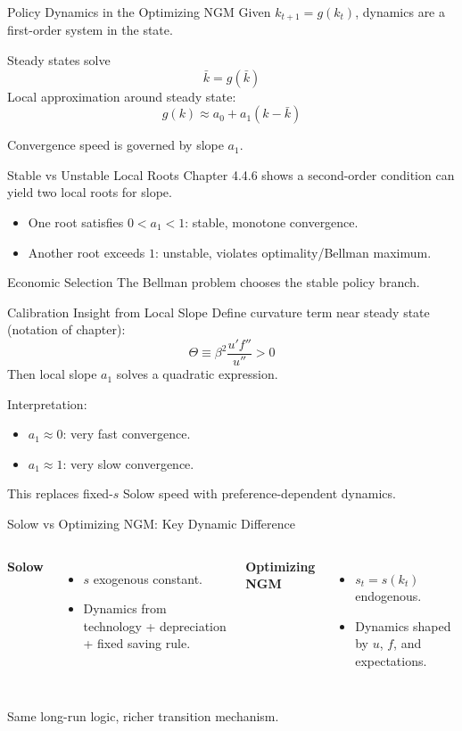 \documentclass[aspectratio=169,10pt]{beamer}
\begin{document}
\begin{frame}{Policy Dynamics in the Optimizing NGM}
Given $k_{t+1}=g(k_t)$, dynamics are a first-order system in the state.

\medskip
Steady states solve
\[
\bar{k}=g(\bar{k})
\]
Local approximation around steady state:
\[
g(k)\approx a_0+a_1(k-\bar{k})
\]

Convergence speed is governed by slope $a_1$.
\end{frame}

\begin{frame}{Stable vs Unstable Local Roots}
Chapter 4.4.6 shows a second-order condition can yield two local roots for slope.

\begin{itemize}
  \item One root satisfies $0<a_1<1$: stable, monotone convergence.
  \item Another root exceeds $1$: unstable, violates optimality/Bellman maximum.
\end{itemize}

\begin{block}{Economic Selection}
The Bellman problem chooses the stable policy branch.
\end{block}
\end{frame}

\begin{frame}{Calibration Insight from Local Slope}
Define curvature term near steady state (notation of chapter):
\[
\Theta\equiv\beta^2\frac{u' f''}{u''}>0
\]
Then local slope $a_1$ solves a quadratic expression.

\medskip
Interpretation:
\begin{itemize}
  \item $a_1\approx 0$: very fast convergence.
  \item $a_1\approx 1$: very slow convergence.
\end{itemize}

This replaces fixed-$s$ Solow speed with preference-dependent dynamics.
\end{frame}

\begin{frame}{Solow vs Optimizing NGM: Key Dynamic Difference}
\begin{columns}[T]
\textbf{Solow}
\begin{itemize}
  \item $s$ exogenous constant.
  \item Dynamics from technology + depreciation + fixed saving rule.
\end{itemize}

\textbf{Optimizing NGM}
\begin{itemize}
  \item $s_t=s(k_t)$ endogenous.
  \item Dynamics shaped by $u$, $f$, and expectations.
\end{itemize}
\end{columns}

\medskip
Same long-run logic, richer transition mechanism.
\end{frame}
\end{document}
